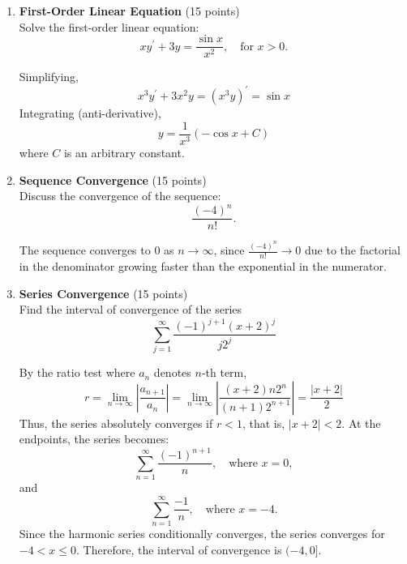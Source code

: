 \begin{enumerate}
  \newpage






  

  \item \textbf{First-Order Linear Equation} (15 points)\\
  Solve the first-order linear equation:
  \[
  x y^{\prime} + 3y = \frac{\sin x}{x^2}, \quad \text{for } x > 0.
  \]
  \begin{subanswer}[red]
    Simplifying, 
    $$
    x^3 y^{\prime}+3 x^2 y=\left(x^3 y\right)^{\prime}=\sin x
    $$
    Integrating (anti-derivative),
    $$
    y=\frac{1}{x^3}\left(-\cos x+C\right)
    $$
    where $C$ is an arbitrary constant.
  \end{subanswer}



  \item \textbf{Sequence Convergence} (15 points)\\
  Discuss the convergence of the sequence:
  \[
  \frac{(-4)^n}{n!}.
  \]
  \begin{subanswer}[red]
    The sequence converges to \(0\) as \(n \to \infty\), since \(\frac{(-4)^n}{n!} \to 0\) due to the factorial in the denominator growing faster than the exponential in the numerator.
  \end{subanswer}








  \newpage

  \item \textbf{Series Convergence} (15 points)\\
  Find the interval of convergence of the series
  $$\sum_{j=1}^{\infty} \frac{(-1)^{j+1}(x+2)^j}{j 2^j}$$
  \begin{subanswer}[red]
    By the ratio test where $a_n$ denotes $n$-th term, 
    $$
    r=\lim _{n \rightarrow \infty} \left|\frac{a_{n+1}}{a_n}\right| = \lim _{n \rightarrow \infty} \left|\frac{(x+2) n 2^n}{(n+1) 2^{n+1}}\right| = \frac{|x+2|}{2}
    $$
    Thus, the series absolutely converges if $r < 1$, that is, 
    $|x+2|<2$. At the endpoints, the series becomes:
    \[
    \sum_{n=1}^\infty \frac{(-1)^{n+1}}{n}, \quad \text{where } x = 0,
    \]
    and
    \[
    \sum_{n=1}^\infty \frac{-1}{n}, \quad \text{where } x = -4.
    \]
    Since the harmonic series conditionally converges, 
    the series converges for $-4 < x \leq 0$. Therefore, 
    the interval of convergence is $(-4, 0]$.
  \end{subanswer}


\end{enumerate}
